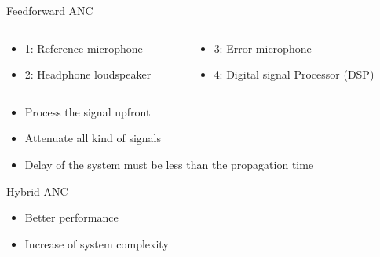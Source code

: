 \begin{frame}{Feedforward ANC}
	\begin{columns}	
			\begin{column}{0.5\textwidth}
			\begin{itemize}
			\item 1: Reference microphone
			\item 2: Headphone loudspeaker
			\end{itemize}
			\end{column}		
	
	\begin{column}{0.5\textwidth} 
	\begin{itemize}
			\item 3: Error microphone
			\item 4: Digital signal Processor (DSP)
	\end{itemize}
	\end{column}	
	\end{columns}	
	
	\begin{itemize}
			\item Process the signal upfront
			\item Attenuate all kind of signals
			\item Delay of the system must be less than the propagation time
	\end{itemize}		
\end{frame}

\begin{frame}{Hybrid ANC}
	\begin{itemize}
			\item Better performance
			\item Increase of system complexity 
	\end{itemize}		
\end{frame}

